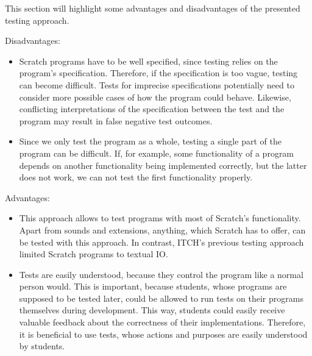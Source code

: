 This section will highlight some advantages and disadvantages of the presented testing approach.
\parspace


\noindent Disadvantages:

\begin{itemize}
    \item Scratch programs have to be well specified, since testing relies on the program's specification.
        Therefore, if the specification is too vague, testing can become difficult.
        Tests for imprecise specifications potentially need to consider more possible cases of how the program could behave.
        Likewise, conflicting interpretations of the specification between the test and the program may result in false negative test outcomes.
    \item Since we only test the program as a whole, testing a single part of the program can be difficult.
        If, for example, some functionality of a program depends on another functionality being implemented correctly,
        but the latter does not work, we can not test the first functionality properly.
\end{itemize}

\noindent Advantages:

\begin{itemize}
    \item This approach allows to test programs with most of Scratch's functionality.
        Apart from sounds and extensions, anything, which Scratch has to offer, can be tested with this approach.
        In contrast, ITCH's previous testing approach limited Scratch programs to textual IO.
    \item Tests are easily understood, because they control the program like a normal person would.
        This is important, because students, whose programs are supposed to be tested later,
        could be allowed to run tests on their programs themselves during development.
        This way, students could easily receive valuable feedback about the correctness of their implementations.
        Therefore, it is beneficial to use tests, whose actions and purposes are easily understood by students.
\end{itemize}

